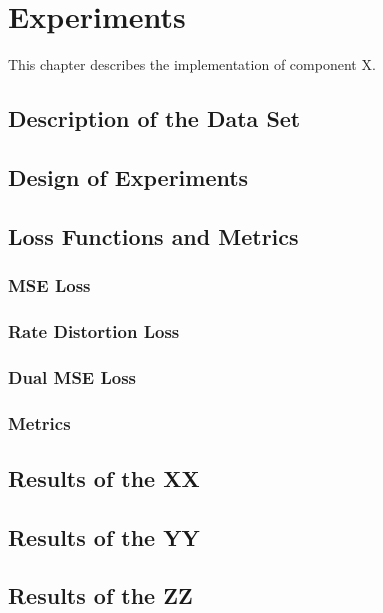 \chapter{Experiments\label{cha:chapter5}}
This chapter describes the implementation of component X.

\section{Description of the Data Set\label{sec:xx}}

\section{Design of Experiments\label{sec:yy}}

\section{Loss Functions and Metrics}

\subsection{MSE Loss}

\subsection{Rate Distortion Loss}

\subsection{Dual MSE Loss}

\subsection{Metrics}

\section{Results of the XX\label{sec:ch5xx}}

\section{Results of the YY\label{sec:ch5yy}}

\section{Results of the ZZ\label{sec:ch5zz}}

